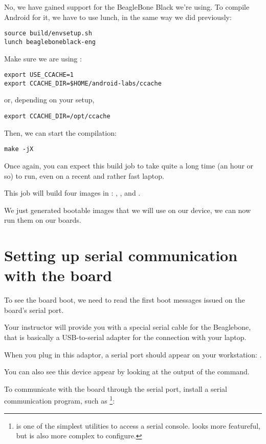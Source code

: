 No, we have gained support for the BeagleBone Black we're using. To
compile Android for it, we have to use lunch, in the same way we did
previously:

\begin{verbatim}
source build/envsetup.sh
lunch beagleboneblack-eng
\end{verbatim}

Make sure we are using :

\begin{verbatim}
export USE_CCACHE=1
export CCACHE_DIR=$HOME/android-labs/ccache
\end{verbatim}
or, depending on your setup,
\begin{verbatim}
export CCACHE_DIR=/opt/ccache
\end{verbatim}

Then, we can start the compilation:

\begin{verbatim}
make -jX
\end{verbatim}

Once again, you can expect this build job to take quite a long time
(an hour or so) to run, even on a recent and rather fast laptop.

This job will build four images in
: ,
 ,  and
.

We just generated bootable images that we will use on our device, we
can now run them on our boards.

\section{Setting up serial communication with the board}

To see the board boot, we need to read the first boot messages issued
on the board's serial port.

Your instructor will provide you with a special serial cable for the
Beaglebone, that is basically a USB-to-serial adapter for the
connection with your laptop.

When you plug in this adaptor, a serial port should appear on your
workstation: .

You can also see this device appear by looking at the output of the
 command.

To communicate with the board through the serial port, install a
serial communication program, such as \footnote
{ is one of the simplest utilities to access a
  serial console.  looks more featureful, but is also
  more complex to configure.}:

